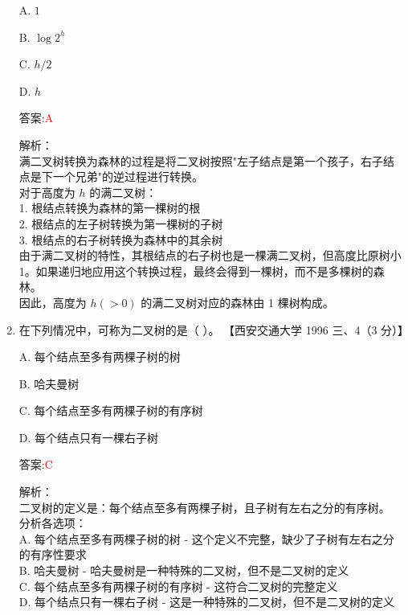 \documentclass[lang=cn,newtx,10pt,scheme=chinese]{../../../elegantbook}
\begin{document}
\begin{enumerate}
    A. $1$  

    B. $\log2^h$  

    C. $h/2$  

    D. $h$  

    答案:\textcolor{red}{A}
    
    解析：\\
    满二叉树转换为森林的过程是将二叉树按照"左子结点是第一个孩子，右子结点是下一个兄弟"的逆过程进行转换。\\
    
    对于高度为 $h$ 的满二叉树：\\
    1. 根结点转换为森林的第一棵树的根\\
    2. 根结点的左子树转换为第一棵树的子树\\
    3. 根结点的右子树转换为森林中的其余树\\
    
    由于满二叉树的特性，其根结点的右子树也是一棵满二叉树，但高度比原树小 1。如果递归地应用这个转换过程，最终会得到一棵树，而不是多棵树的森林。\\
    
    因此，高度为 $h (> 0)$ 的满二叉树对应的森林由 1 棵树构成。\\  

    \item 在下列情况中，可称为二叉树的是（ ）。  
    【西安交通大学 1996 三、4（3 分）】  

    A. 每个结点至多有两棵子树的树  

    B. 哈夫曼树  

    C. 每个结点至多有两棵子树的有序树  

    D. 每个结点只有一棵右子树  

    答案:\textcolor{red}{C}
    
    解析：\\
    二叉树的定义是：每个结点至多有两棵子树，且子树有左右之分的有序树。\\
    
    分析各选项：\\
    A. 每个结点至多有两棵子树的树 - 这个定义不完整，缺少了子树有左右之分的有序性要求\\
    
    B. 哈夫曼树 - 哈夫曼树是一种特殊的二叉树，但不是二叉树的定义\\
    
    C. 每个结点至多有两棵子树的有序树 - 这符合二叉树的完整定义\\
    
    D. 每个结点只有一棵右子树 - 这是一种特殊的二叉树，但不是二叉树的定义\\
    

\end{enumerate}
\end{document}
